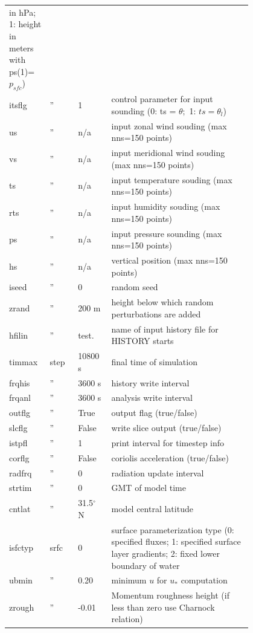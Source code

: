 \documentclass[11pt,a4paper]{article}
\begin{document}
\begin{longtable}[htb]{p{0.1\linewidth}p{0.1\linewidth}p{0.1\linewidth}p{0.5\linewidth}}
in hPa; 1: height in meters with ps(1)= $p_{sfc}$) \\
itsflg&  ''  & 1   & control parameter for input sounding (0: ts =
$\theta;$ 1: $ts = \theta_l$) \\
us    &  ''  & n/a & input zonal wind souding (max nns=150 points) \\
vs    &  ''  & n/a & input meridional wind souding (max nns=150
points) \\
ts    &  ''  & n/a & input temperature souding (max nns=150 points) \\
rts   &  ''  & n/a & input humidity souding (max nns=150 points) \\
ps    &  ''  & n/a & input pressure sounding (max nns=150 points) \\
hs    &  ''  & n/a & vertical position (max nns=150 points) \\
iseed &  ''  & 0   &  random seed \\
zrand &  ''  & 200 m & height below which random perturbations are added \\
hfilin & ''  & test. & name of input history file for HISTORY starts
\\ \hline
timmax & step& 10800 s  &  final time of simulation \\ 
frqhis    & '' & 3600 s &  history write interval \\
frqanl    & '' & 3600 s &  analysis write interval  \\
outflg    & '' & True   &  output flag (true/false) \\
slcflg    & '' & False  &  write slice output (true/false) \\ 
istpfl    & '' & 1 &  print interval for timestep info \\
corflg    & '' & False   &  coriolis acceleration (true/false) \\
radfrq    & '' & 0   &  radiation update interval \\
strtim    & '' & 0   &  GMT of model time \\
cntlat    & '' & 31.5$^{\circ}$ N &  model central latitude \\  \hline
isfctyp   & srfc & 0  &  surface parameterization type (0: specified
fluxes; 1: specified surface layer gradients; 2: fixed lower boundary
of water \\
 ubmin     & '' & 0.20  &  minimum $u$ for $u_*$ computation \\
 zrough    & '' & -0.01 &  Momentum roughness height (if less than
 zero use Charnock relation)\\

\end{longtable}
\end{document}
